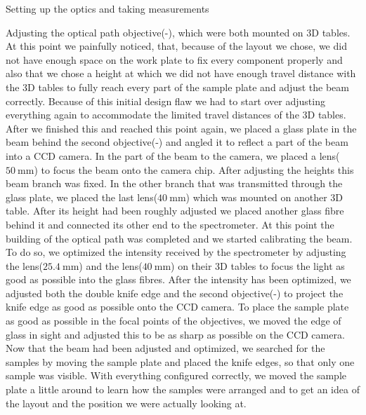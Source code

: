 \documentclass[pdftex, a4paper,11pt, twoside, UKenglish]{report}
\begin{document}
\begin{chapter}{Setting up the optics and taking measurements}
\begin{section}{Adjusting the optical path}
      objective(-), which were both mounted on 3D tables. At this point we
      painfully noticed, that, because of the layout we chose, we did not have
      enough space on the work plate to fix every component properly and also
      that we chose a height at which we did not have enough travel distance
      with the 3D tables to fully reach every part of the sample plate and
      adjust the beam correctly. Because of this initial design flaw we had to
      start over adjusting everything again to accommodate the limited
      travel distances of the 3D tables. \newline
      After we finished this and reached this point again, we placed a glass
      plate in the beam behind the second objective(-) and angled it to
      reflect a part of the beam into a CCD camera. In the part of the beam
      to the camera, we placed a lens($\SI{+50}{\milli\meter}$) to focus the
      beam onto the camera chip. After adjusting the heights this beam branch
      was fixed.\newline
      In the other branch that was transmitted through the glass plate, we
      placed the last lens($\SI{+40}{\milli\meter}$) which was mounted on
      another 3D table. After its height had been roughly adjusted we placed
      another glass fibre behind it and connected its other end to the
      spectrometer. \newline
      At this point the building of the optical path was completed
      and we started calibrating the beam. To do so, we optimized the intensity
      received by the spectrometer by adjusting the
      lens($\SI{+25.4}{\milli\meter}$) and the lens($\SI{+40}{\milli\meter}$)
      on their 3D tables to focus the light as good as possible into the glass
      fibres. After the intensity has been optimized, we adjusted both the
      double knife edge and the second objective(-) to project the knife edge
      as good as possible onto the CCD camera. To place the sample plate as good
      as possible in the focal points of the objectives, we moved the edge of
      glass in sight and adjusted this to be as sharp as possible on the CCD
      camera. \newline
      Now that the beam had been adjusted and optimized, we searched for the
      samples by moving the sample plate and placed the knife edges, so that
      only one sample was visible. \newline
      With everything configured correctly, we moved the sample plate a little
      around to learn how the samples were arranged and to get an idea of the
      layout and the position we were actually looking at.
      \vfill
    \end{section}
    

\end{chapter}
\end{document}

